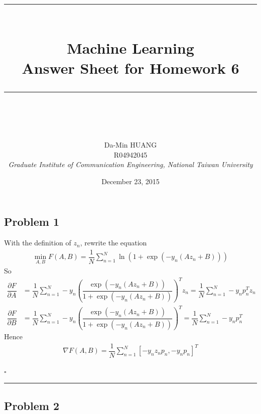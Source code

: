 \documentclass[12pt]{article}
\newcommand*{\QEDB}{\hfill\ensuremath{\square}}
\newcommand{\SBrackets}[1]{\left[#1\right]}
\newcommand{\ParTh}[1]{\left(#1\right)}
\newcommand{\horrule}[1]{\rule{\linewidth}{#1}}
\begin{document}
\baselineskip 6.5mm
\setlength{\parindent}{0pt}
\title{ 
\normalfont \normalsize 
\horrule{0.5pt} \\[0.4cm]
\huge { \Huge Machine Learning \\ \large Answer Sheet for Homework 6 }\\
\horrule{2pt} \\ [0.5cm]
}
\author{ { \Large Da-Min HUANG } \\
{\small R04942045} \\
{\small\textit{Graduate Institute of Communication Engineering, National Taiwan University}}
}
\date{December 23, 2015}
\maketitle

\subsection*{Problem 1}

With the definition of $z_n$, rewrite the equation
\begin{align}
\min_{A,B}F\ParTh{A,B}=\dfrac{1}{N}\sum_{n=1}^{N}\ln\ParTh{1+\exp\ParTh{-y_n\ParTh{Az_n+B}}}
\end{align}
So
\begin{align}
\dfrac{\partial F}{\partial A}&=\dfrac{1}{N}\sum_{n=1}^{N}-y_n\ParTh{\dfrac{\exp\ParTh{-y_n\ParTh{Az_n+B}}}{1+\exp\ParTh{-y_n\ParTh{Az_n+B}}}}^Tz_n=\dfrac{1}{N}\sum_{n=1}^{N}-y_np^T_nz_n\\
\dfrac{\partial F}{\partial B}&=\dfrac{1}{N}\sum_{n=1}^{N}-y_n\ParTh{\dfrac{\exp\ParTh{-y_n\ParTh{Az_n+B}}}{1+\exp\ParTh{-y_n\ParTh{Az_n+B}}}}^T=\dfrac{1}{N}\sum_{n=1}^{N}-y_np^T_n
\end{align}
Hence
\begin{align}
\nabla F\ParTh{A,B}=\dfrac{1}{N}\sum_{n=1}^{N}\SBrackets{-y_nz_np_n,-y_np_n}^T
\end{align}

\QEDB

\horrule{0.5pt}

\subsection*{Problem 2}
\end{document}
